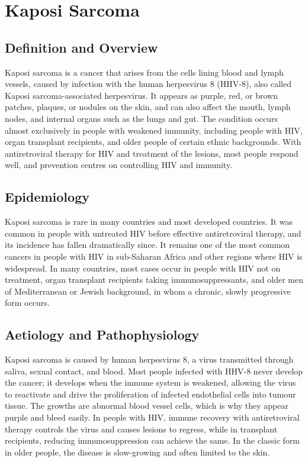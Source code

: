 \chapter{Kaposi Sarcoma}

\section*{Definition and Overview}
Kaposi sarcoma is a cancer that arises from the cells lining blood and lymph vessels, caused by infection with the human herpesvirus 8 (HHV-8), also called Kaposi sarcoma-associated herpesvirus. It appears as purple, red, or brown patches, plaques, or nodules on the skin, and can also affect the mouth, lymph nodes, and internal organs such as the lungs and gut. The condition occurs almost exclusively in people with weakened immunity, including people with HIV, organ transplant recipients, and older people of certain ethnic backgrounds. With antiretroviral therapy for HIV and treatment of the lesions, most people respond well, and prevention centres on controlling HIV and immunity.

\section*{Epidemiology}
Kaposi sarcoma is rare in many countries and most developed countries. It was common in people with untreated HIV before effective antiretroviral therapy, and its incidence has fallen dramatically since. It remains one of the most common cancers in people with HIV in sub-Saharan Africa and other regions where HIV is widespread. In many countries, most cases occur in people with HIV not on treatment, organ transplant recipients taking immunosuppressants, and older men of Mediterranean or Jewish background, in whom a chronic, slowly progressive form occurs.

\section*{Aetiology and Pathophysiology}
Kaposi sarcoma is caused by human herpesvirus 8, a virus transmitted through saliva, sexual contact, and blood. Most people infected with HHV-8 never develop the cancer; it develops when the immune system is weakened, allowing the virus to reactivate and drive the proliferation of infected endothelial cells into tumour tissue. The growths are abnormal blood vessel cells, which is why they appear purple and bleed easily. In people with HIV, immune recovery with antiretroviral therapy controls the virus and causes lesions to regress, while in transplant recipients, reducing immunosuppression can achieve the same. In the classic form in older people, the disease is slow-growing and often limited to the skin.

